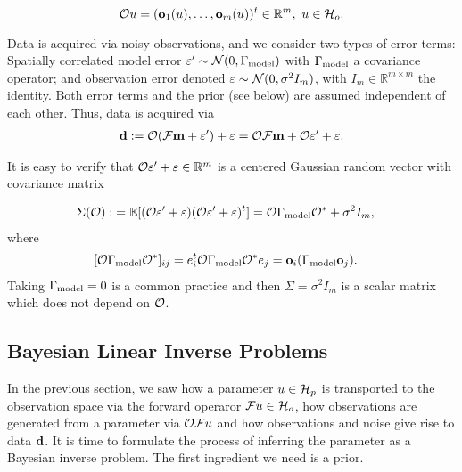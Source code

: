 \begin{equation*}%
  \obs u = (\meas_1(u), \dots, \meas_m(u) )^t \in \R^m,\ u \in \hilo.
\end{equation*}

Data is acquired via noisy observations, and we consider two types of
error terms: Spatially correlated model error \(\varepsilon' \sim
\mathcal{N}(0,\Gamma_{\textup{model}})\) with \(\Gamma_{\textup{model}}\) a covariance operator; and
observation error denoted \(\varepsilon \sim \mathcal{N}(0, \sigma^2 I_m)\), with
\(I_m \in \mathbb{R}^{m \times m}\) the identity. Both error terms and
the prior (see below) are assumed independent of each other. Thus,
data is acquired via
\begin{align}\label{eq:inverse problem}
  \data := \obs (\fwd \param + \eps') + \eps = \obs \fwd \param + \obs \eps' + \eps.
\end{align}

It is easy to verify that \(\mathcal{O} \varepsilon' + \varepsilon \in \mathbb{R}^m\) is a centered
Gaussian random vector with covariance matrix

\begin{align}\label{eq:Sigma}
  \begin{split}
    \Sigma(\obs) :&= \mathbb{E}[ (\obs \eps' + \eps) (\obs \eps' +
      \eps)^t ]
    = \obs \modcov \obs^* + \sigma^2I_m , 
  \end{split}
\end{align}
where
\begin{align}\label{eq:modcov explained}
  \begin{split}
    [\obs \modcov \obs^*]_{ij} & = e_i^t \obs \modcov \obs^* e_j 
    = \meas_i (\modcov \meas_j).%
  \end{split}
\end{align}
Taking \(\Gamma_{\textup{model}} = 0\) is a common practice
\cite{tarantola2005,kaipio2005,Vogel02} and then \(\Sigma =
\sigma^2I_m\) is a scalar matrix which does not depend on \(\mathcal{O}\).

\subsection{Bayesian Linear Inverse Problems}\label{subsec:bayesian inverse problems}
In the previous section, we saw how a parameter $u\in \mathcal{H}_p$ is
transported to the observation space via the forward operaror $\mathcal{F} u
\in \mathcal{H}_o$, how observations are generated from a parameter via $\mathcal{O}
\mathcal{F} u$ and how observations and noise give rise to data $\mathbf{d}$. It
is time to formulate the process of inferring the parameter as a
Bayesian inverse problem. The first ingredient we need is a prior.


